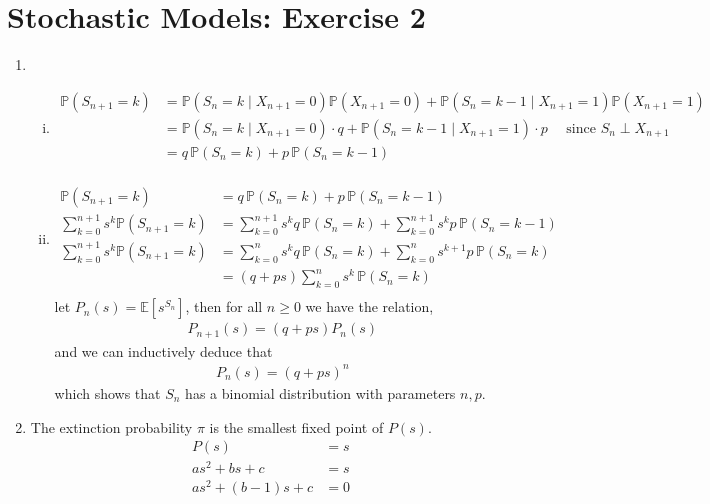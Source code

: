 \documentclass[a4paper,10pt]{article}
\theoremstyle{definition}
\begin{document}
\section*{Stochastic Models: Exercise 2}

\begin{enumerate}
\item
\begin{enumerate}[(i)]
\item 
\begin{align*}
\mathbb{P}(S_{n+1}=k)&=\mathbb{P}(S_{n}=k\mid X_{n+1}=0)\mathbb{P}(X_{n+1}=0)+\mathbb{P}(S_{n}=k-1\mid X_{n+1}=1)\mathbb{P}(X_{n+1}=1)\\
&=\mathbb{P}(S_{n}=k\mid X_{n+1}=0)\cdot q+\mathbb{P}(S_{n}=k-1\mid X_{n+1}=1)\cdot p \quad\text{ since $S_n \perp X_{n+1}$}\\
&=q\,\mathbb{P}(S_{n}=k)+p\,\mathbb{P}(S_{n}=k-1)\\
\end{align*}
\item 
\begin{align*}
\mathbb{P}(S_{n+1}=k)&=q\,\mathbb{P}(S_{n}=k)+p\,\mathbb{P}(S_{n}=k-1)\\
\sum_{k=0}^{n+1}s^k\mathbb{P}(S_{n+1}=k)&=\sum_{k=0}^{n+1}s^kq\,\mathbb{P}(S_{n}=k)+\sum_{k=0}^{n+1}s^kp\,\mathbb{P}(S_{n}=k-1)\\
\sum_{k=0}^{n+1}s^k\mathbb{P}(S_{n+1}=k)&=\sum_{k=0}^{n}s^kq\,\mathbb{P}(S_{n}=k)+\sum_{k=0}^{n}s^{k+1}p\,\mathbb{P}(S_{n}=k)\\
&=(q+ps)\sum_{k=0}^{n}s^k\,\mathbb{P}(S_{n}=k)\\
\end{align*}
let $P_{n}(s) = \mathbb{E}[s^{S_n}]$, then for all $n\geq 0$ we have the relation,
\begin{align*}
P_{n+1}(s)=(q+ps)P_{n}(s)
\end{align*}
and we can inductively deduce that 
\begin{align*}
P_{n}(s)=(q+ps)^n
\end{align*}
which shows that $S_n$ has a binomial distribution with parameters $n, p$.
\end{enumerate}
\item
The extinction probability $\pi$ is the smallest fixed point of $P(s)$. 
\begin{align*}
P(s) &= s\\
as^2+bs+c&=s\\
as^2+(b-1)s+c&=0\\

\end{align*}
\end{enumerate}
\end{document}
